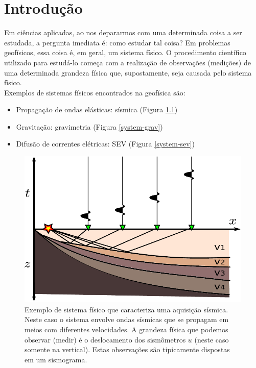 \chapter{Introdução}
\label{chap:intro}

\indent Em ciências aplicadas, ao nos depararmos com uma determinada coisa a ser
estudada, a pergunta imediata é: como estudar tal coisa? Em problemas geofísicos,
essa coisa é, em geral, um sistema físico. O procedimento científico utilizado
para estudá-lo começa com a realização de observações (medições) de uma
determinada grandeza física que, supostamente, seja causada pelo sistema físico.
\\
\indent Exemplos de sistemas físicos encontrados na geofísica são:

\begin{itemize}
    \item{Propagação de ondas elásticas: sísmica (Figura \ref{system-seismic})}
    \item{Gravitação: gravimetria (Figura \ref{system-grav})}
    \item{Difusão de correntes elétricas: SEV (Figura \ref{system-sev})}
\end{itemize}

\begin{figure}
    \centering
    \includegraphics[scale=1]{../figs/system-seismic}
    \caption{Exemplo de sistema físico que caracteriza uma aquisição sísmica.
        Neste caso o sistema envolve ondas sísmicas que se propagam em meios com
        diferentes velocidades. A grandeza física que podemos observar (medir)
        é o deslocamento dos sismômetros $u$ (neste caso somente na vertical).
        Estas observações são tipicamente dispostas em um sismograma.}
    \label{system-seismic}
\end{figure}

